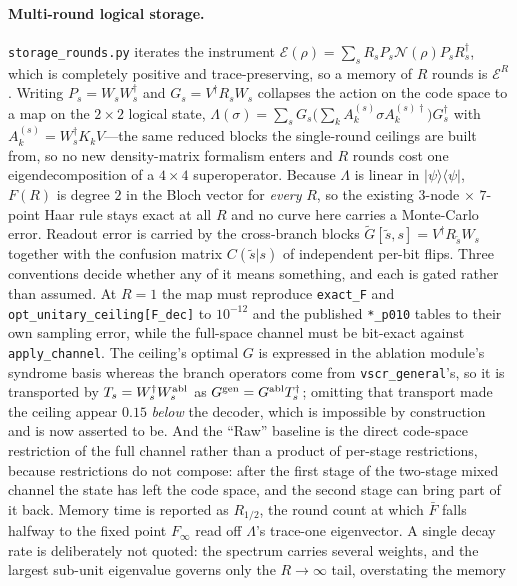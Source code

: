 \documentclass[aps,prxquantum,reprint,superscriptaddress]{revtex4-2}
\newcommand{\ket}[1]{\lvert #1\rangle}
\newcommand{\bra}[1]{\langle #1\rvert}
\begin{document}
\paragraph{Multi-round logical storage.}
\texttt{storage\_rounds.py} iterates the instrument
$\mathcal{E}(\rho)=\sum_sR_sP_s\mathcal{N}(\rho)P_sR_s^\dagger$, which is
completely positive and trace-preserving, so a memory of $R$ rounds is
$\mathcal{E}^R$. Writing $P_s=W_sW_s^\dagger$ and $G_s=V^\dagger R_sW_s$
collapses the action on the code space to a map on the $2\times2$ logical state,
$\Lambda(\sigma)=\sum_sG_s\big(\sum_kA_k^{(s)}\sigma
A_k^{(s)\dagger}\big)G_s^\dagger$ with $A_k^{(s)}=W_s^\dagger K_kV$---the same
reduced blocks the single-round ceilings are built from, so no new
density-matrix formalism enters and $R$ rounds cost one eigendecomposition of a
$4\times4$ superoperator. Because $\Lambda$ is linear in $\ket\psi\bra\psi$,
$F(R)$ is degree $2$ in the Bloch vector for \emph{every} $R$, so the existing
$3$-node $\times$ $7$-point Haar rule stays exact at all $R$ and no curve here
carries a Monte-Carlo error. Readout error is carried by the cross-branch blocks
$\tilde G[\tilde s,s]=V^\dagger R_{\tilde s}W_s$ together with the confusion
matrix $C(\tilde s|s)$ of independent per-bit flips. Three conventions decide
whether any of it means something, and each is gated rather than assumed. At
$R=1$ the map must reproduce \texttt{exact\_F} and
\texttt{opt\_unitary\_ceiling[F\_dec]} to $10^{-12}$ and the published
\texttt{*\_p010} tables to their own sampling error, while the full-space
channel must be bit-exact against \texttt{apply\_channel}. The ceiling's optimal
$G$ is expressed in the ablation module's syndrome basis whereas the branch
operators come from \texttt{vscr\_general}'s, so it is transported by
$T_s=W_s^\dagger W^{\rm abl}_s$ as $G^{\rm gen}=G^{\rm abl}T_s^\dagger$;
omitting that transport made the ceiling appear $0.15$ \emph{below} the decoder,
which is impossible by construction and is now asserted to be. And the ``Raw''
baseline is the direct code-space restriction of the full channel rather than a
product of per-stage restrictions, because restrictions do not compose: after
the first stage of the two-stage mixed channel the state has left the code
space, and the second stage can bring part of it back. Memory time is reported
as $R_{1/2}$, the round count at which $\bar F$ falls halfway to the fixed point
$F_\infty$ read off $\Lambda$'s trace-one eigenvector. A single decay rate is
deliberately not quoted: the spectrum carries several weights, and the largest
sub-unit eigenvalue governs only the $R\to\infty$ tail, overstating the memory
\end{document}

